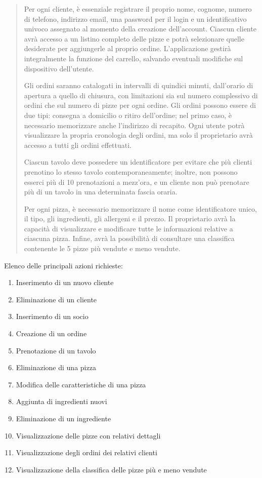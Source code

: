 \documentclass[a4paper,12pt, oneside]{article}
\begin{document}
\begin{quote}

Per ogni cliente, è essenziale registrare il proprio nome, cognome,
numero di telefono, indirizzo email, una password per il login e un
identificativo univoco assegnato al momento della creazione
dell'account. Ciascun cliente avrà accesso a un listino completo delle
pizze e potrà selezionare quelle desiderate per aggiungerle al proprio
ordine. L'applicazione gestirà integralmente la funzione del carrello,
salvando eventuali modifiche sul dispositivo dell'utente.

Gli ordini saranno catalogati in intervalli di quindici minuti,
dall'orario di apertura a quello di chiusura, con limitazioni sia sul
numero complessivo di ordini che sul numero di pizze per ogni ordine.
Gli ordini possono essere di due tipi: consegna a domicilio o ritiro
dell'ordine; nel primo caso, è necessario memorizzare anche
l'indirizzo di recapito. Ogni utente potrà visualizzare la propria
cronologia degli ordini, ma solo il proprietario avrà accesso a tutti
gli ordini effettuati.

Ciascun tavolo deve possedere un identificatore per evitare che più
clienti prenotino lo stesso tavolo contemporaneamente; inoltre, non
possono esserci più di 10 prenotazioni a mezz'ora, e un cliente non
può prenotare più di un tavolo in una determinata fascia oraria.

Per ogni pizza, è necessario memorizzare il nome come identificatore
unico, il tipo, gli ingredienti, gli allergeni e il prezzo. Il
proprietario avrà la capacità di visualizzare e modificare tutte le
informazioni relative a ciascuna pizza. Infine, avrà la possibilità
di consultare una classifica contenente le 5 pizze più vendute e
meno vendute.

\end{quote}

Elenco delle principali azioni richieste:
\begin{enumerate}
    \item Inserimento di un nuovo cliente
    \item Eliminazione di un cliente
    \item Inserimento di un socio
    \item Creazione di un ordine
    \item Prenotazione di un tavolo
    \item Eliminazione di una pizza
    \item Modifica delle caratteristiche di una pizza
    \item Aggiunta di ingredienti nuovi
    \item Eliminazione di un ingrediente
    \item Visualizzazione delle pizze con relativi dettagli
    \item Visualizzazione degli ordini dei relativi clienti
    \item Visualizzazione della classifica delle pizze più e meno vendute
\end{enumerate}
\end{document}

